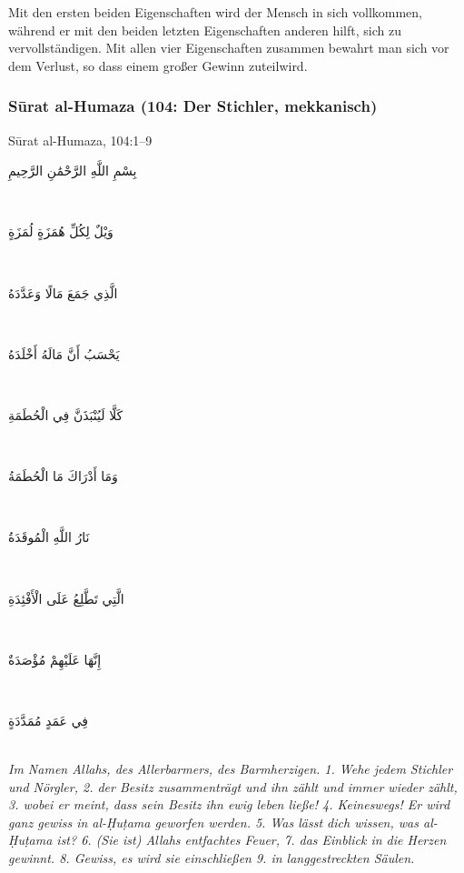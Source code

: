 \begin{merke}
Mit den ersten beiden Eigenschaften wird der Mensch in sich vollkommen, während er mit den
beiden letzten Eigenschaften anderen hilft, sich zu vervollständigen. Mit allen vier Eigenschaften
zusammen bewahrt man sich vor dem Verlust, so dass einem großer Gewinn zuteilwird.
\end{merke}

\subsubsection*{Sūrat al-Humaza (104: Der Stichler, mekkanisch)}

\begin{quranvers}{Sūrat al-Humaza, 104:1--9}
{\quranfont\begin{Arabic}
بِسْمِ اللَّهِ الرَّحْمَٰنِ الرَّحِيمِ
\end{Arabic}}\\[2mm]
{\quranfont\begin{Arabic}
وَيْلٌ لِكُلِّ هُمَزَةٍ لُمَزَةٍ
\end{Arabic}}\\[2mm]
{\quranfont\begin{Arabic}
الَّذِي جَمَعَ مَالًا وَعَدَّدَهُ
\end{Arabic}}\\[2mm]
{\quranfont\begin{Arabic}
يَحْسَبُ أَنَّ مَالَهُ أَخْلَدَهُ
\end{Arabic}}\\[2mm]
{\quranfont\begin{Arabic}
كَلَّا لَيُنْبَذَنَّ فِي الْحُطَمَةِ
\end{Arabic}}\\[2mm]
{\quranfont\begin{Arabic}
وَمَا أَدْرَاكَ مَا الْحُطَمَةُ
\end{Arabic}}\\[2mm]
{\quranfont\begin{Arabic}
نَارُ اللَّهِ الْمُوقَدَةُ
\end{Arabic}}\\[2mm]
{\quranfont\begin{Arabic}
الَّتِي تَطَّلِعُ عَلَى الْأَفْئِدَةِ
\end{Arabic}}\\[2mm]
{\quranfont\begin{Arabic}
إِنَّهَا عَلَيْهِمْ مُؤْصَدَةٌ
\end{Arabic}}\\[2mm]
{\quranfont\begin{Arabic}
فِي عَمَدٍ مُمَدَّدَةٍ
\end{Arabic}}\\[3mm]
\emph{Im Namen Allahs, des Allerbarmers, des Barmherzigen. 1. Wehe jedem Stichler und
Nörgler, 2. der Besitz zusammenträgt und ihn zählt und immer wieder zählt, 3. wobei er meint,
dass sein Besitz ihn ewig leben ließe! 4. Keineswegs! Er wird ganz gewiss in al-Ḥuṭama geworfen
werden. 5. Was lässt dich wissen, was al-Ḥuṭama ist? 6. (Sie ist) Allahs entfachtes Feuer, 7. das
Einblick in die Herzen gewinnt. 8. Gewiss, es wird sie einschließen 9. in langgestreckten Säulen.}
\end{quranvers}

